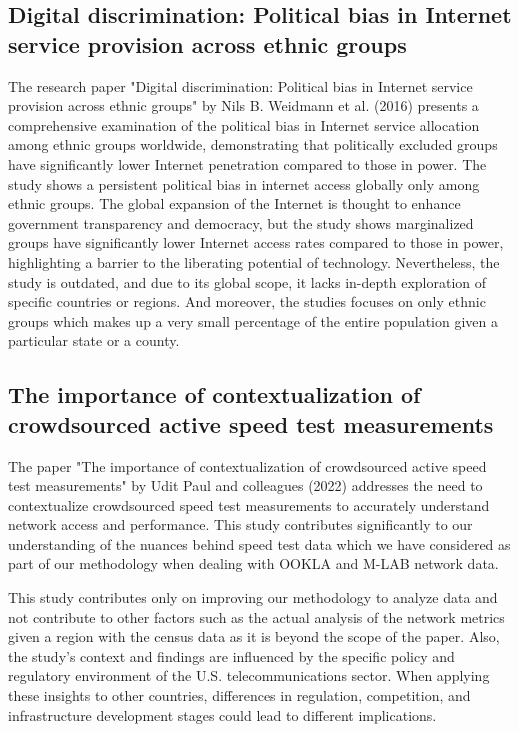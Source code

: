 \documentclass[conference]{IEEEtran}
\begin{document}
\subsection{\textbf{Digital discrimination: Political bias in Internet service provision across ethnic groups \cite{4}}}
The research paper "Digital discrimination: Political bias in Internet service provision across ethnic groups" by Nils B. Weidmann et al. (2016) presents a comprehensive examination of the political bias in Internet service allocation among ethnic groups worldwide, demonstrating that politically excluded groups have significantly lower Internet penetration compared to those in power. The study shows a persistent political bias in internet access globally only among ethnic groups. The global expansion of the Internet is thought to enhance government transparency and democracy, but the study shows marginalized groups have significantly lower Internet access rates compared to those in power, highlighting a barrier to the liberating potential of technology. Nevertheless, the study is outdated, and due to its global scope, it lacks in-depth exploration of specific countries or regions. And moreover, the studies focuses on only ethnic groups which makes up a very small percentage of the entire population given a particular state or a county.


\subsection{\textbf{The importance of contextualization of crowdsourced active speed test measurements \cite{5}}}
The paper "The importance of contextualization of crowdsourced active speed test measurements" by Udit Paul and colleagues (2022) addresses the need to contextualize crowdsourced speed test measurements to accurately understand network access and performance. This study contributes significantly to our understanding of the nuances behind speed test data which we have considered as part of our methodology when dealing with OOKLA and M-LAB network data.

This study contributes only on improving our methodology to analyze data and not contribute to other factors such as the actual analysis of the network metrics given a region with the census data as it is beyond the scope of the paper. Also, the study's context and findings are influenced by the specific policy and regulatory environment of the U.S. telecommunications sector. When applying these insights to other countries, differences in regulation, competition, and infrastructure development stages could lead to different implications.
\end{document}
